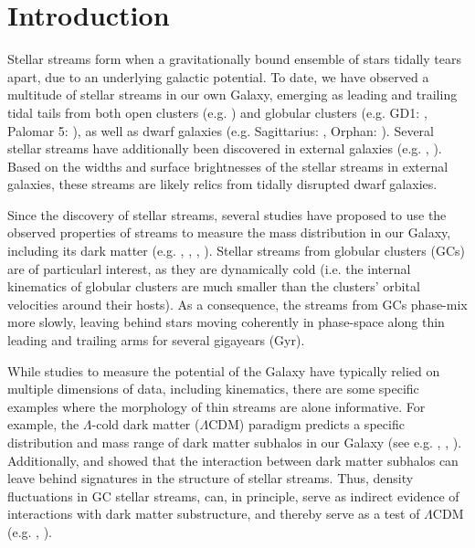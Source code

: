 \documentclass[twocolumn]{aastex62}
\begin{document}
\section{Introduction} \label{sec:intro}
Stellar streams form when a gravitationally bound ensemble of stars tidally tears apart, due to an underlying galactic potential. To date, we have observed a multitude of stellar streams in our own Galaxy, emerging as leading and trailing tidal tails from both open clusters (e.g. \citealt{roser19}) and globular clusters (e.g. GD1: \citealt{grillmair06}, Palomar 5: \citealt{oden01}), as well as dwarf galaxies (e.g. Sagittarius: \citealt{ibata01}, Orphan: \citealt{belokurov06}). Several stellar streams have additionally been discovered in external galaxies (e.g. \citealt{ibata00}, \citealt{delgado10}). Based on the widths and surface brightnesses of the stellar streams in external galaxies, these streams are likely relics from tidally disrupted dwarf galaxies.

Since the discovery of stellar streams, several studies have proposed to use the observed properties of streams to measure the mass distribution in our Galaxy, including its dark matter (e.g. \citealt{johnston99}, \citealt{koposov10}, \citealt{law10}, \citealt{bovy16}). Stellar streams from globular clusters (GCs) are of particularl interest, as they are dynamically cold (i.e. the internal kinematics of globular clusters are much smaller than the clusters' orbital velocities around their hosts). As a consequence, the streams from GCs phase-mix more slowly, leaving behind stars moving coherently in phase-space along thin leading and trailing arms for several gigayears (Gyr). %

While studies to measure the potential of the Galaxy have typically relied on multiple dimensions of data, including kinematics,
there are some specific examples where the morphology of thin streams are alone informative. For example, the $\Lambda$-cold dark matter ($\Lambda$CDM) paradigm predicts a specific distribution and mass range of dark matter subhalos in our Galaxy (see e.g. \citealt{diemand08}, \citealt{bovy17}, \citealt{bonaca19}). Additionally, \citet{ibata02} and \citet{johnston02} showed that the interaction between dark matter subhalos can leave behind signatures in the structure of stellar streams. Thus, density fluctuations in GC stellar streams, can, in principle, serve as indirect evidence of interactions with dark matter substructure, and thereby serve as a test of $\Lambda$CDM (e.g. \citealt{yoon11}, \citealt{bovy17}).
\end{document}
